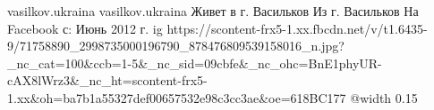  
 
 
 
 

\par
vasilkov.ukraina
vasilkov.ukraina
Живет в г. Васильков
Из г. Васильков
На Facebook с: Июнь 2012 г.
\ifcmt
  ig https://scontent-frx5-1.xx.fbcdn.net/v/t1.6435-9/71758890_2998735000196790_878476809539158016_n.jpg?_nc_cat=100&ccb=1-5&_nc_sid=09cbfe&_nc_ohc=BnE1phyUR-cAX8lWrz3&_nc_ht=scontent-frx5-1.xx&oh=ba7b1a55327def00657532e98c3cc3ae&oe=618BC177
  @width 0.15
\fi

